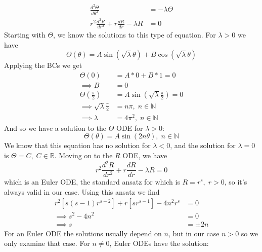 \documentclass[12pt]{article}
\numberwithin{equation}{section}
\begin{document}
\begin{enumerate}
\begin{enumerate}
            \begin{align*}
                \frac{d^2\Theta}{d\theta^2}&=-\lambda \Theta\\
                r^2\frac{d^2R}{dr^2}+r\frac{dR}{dr}-\lambda R&=0
            \end{align*}
            Starting with $\Theta$, we know the solutions to this type of equation. For $\lambda>0$ we have
            \begin{equation*}
                \Theta(\theta)=A\sin(\sqrt\lambda \theta)+B\cos(\sqrt\lambda \theta)
            \end{equation*}
            Applying the BCs we get
            \begin{align*}
                \Theta(0)&=A*0+B*1=0\\
                \implies B&=0\\
                \Theta(\frac{\pi}{2})&=A\sin(\sqrt\lambda\frac{\pi}{2})=0\\
                \implies \sqrt\lambda\frac{\pi}{2}&=n\pi,\; n\in\mathbb{N}\\
                \implies \lambda&=4\pi^2,\; n\in\mathbb{N}
            \end{align*}
            And so we have a solution to the $\Theta$ ODE for $\lambda>0$:
            \begin{equation*}
                \Theta(\theta)=A\sin(2n\theta),\; n\in\mathbb{N}
            \end{equation*}
            We know that this equation has no solution for $\lambda<0$, and the solution for $\lambda=0$ is $\Theta=C,\; C\in\mathbb{R}$.\newline
            Moving on to the $R$ ODE, we have
            \begin{equation*}
                r^2\frac{d^2R}{dr^2}+r\frac{dR}{dr}-\lambda R=0
            \end{equation*}
            which is an Euler ODE, the standard ansatz for which is $R=r^s,\; r>0$, so it's always valid in our case. Using this ansatz we find 
            \begin{align*}
                r^2[s(s-1)r^{s-2}]+r[sr^{s-1}]-4n^2r^s&=0\\
                \implies s^2-4n^2&=0\\
                \implies s&=\pm 2n
            \end{align*}
            For an Euler ODE the solutions usually depend on $n$, but in our case $n>0$ so we only examine that case. For $n\neq0$, Euler ODEs have the solution:

\end{enumerate}
\end{enumerate}
\end{document}
